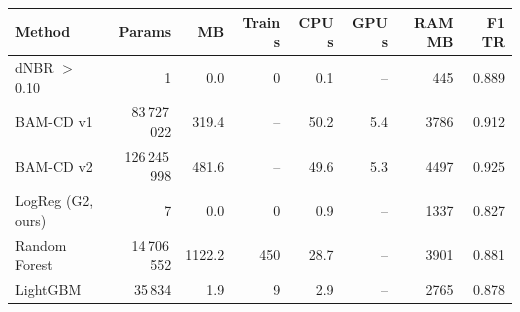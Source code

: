 \begin{tabular}{lrrrrrrr}
\toprule
Method & Params & MB & Train s & CPU s & GPU s & RAM MB & F1 TR \\
\midrule
dNBR $>$ 0.10 & 1 & 0.0 & 0 & 0.1 & -- & 445 & 0.889 \\
BAM-CD v1 & 83\,727\,022 & 319.4 & -- & 50.2 & 5.4 & 3786 & 0.912 \\
BAM-CD v2 & 126\,245\,998 & 481.6 & -- & 49.6 & 5.3 & 4497 & 0.925 \\
LogReg (G2, ours) & 7 & 0.0 & 0 & 0.9 & -- & 1337 & 0.827 \\
Random Forest & 14\,706\,552 & 1122.2 & 450 & 28.7 & -- & 3901 & 0.881 \\
LightGBM & 35\,834 & 1.9 & 9 & 2.9 & -- & 2765 & 0.878 \\
\bottomrule
\end{tabular}
